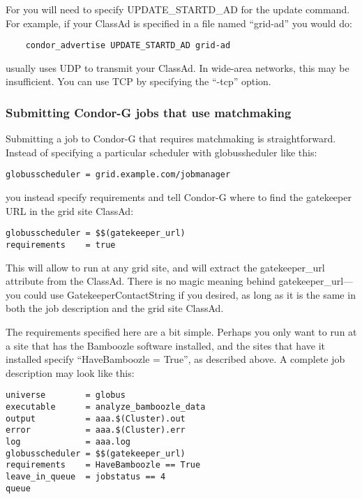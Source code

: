 For  you will need to specify UPDATE\_STARTD\_AD for
the update command. For example, if your ClassAd is specified in a
file named ``grid-ad'' you would do:

\footnotesize
\begin{verbatim}
    condor_advertise UPDATE_STARTD_AD grid-ad
\end{verbatim}
\normalsize

 usually uses UDP to transmit your ClassAd. In
wide-area networks, this may be insufficient. You can use TCP by
specifying the ``-tcp'' option. 

\subsubsection{Submitting Condor-G jobs that use matchmaking}

Submitting a job to Condor-G that requires matchmaking is
straightforward. Instead of specifying a particular scheduler with
globussheduler like this:

\footnotesize
\begin{verbatim}
globusscheduler = grid.example.com/jobmanager
\end{verbatim}
\normalsize

you instead specify requirements and tell Condor-G where to find the
gatekeeper URL in the grid site ClassAd:

\footnotesize
\begin{verbatim}
globusscheduler = $$(gatekeeper_url)
requirements    = true
\end{verbatim}
\normalsize

This will allow to run at any grid site, and will extract the
gatekeeper\_url attribute from the ClassAd. There is no magic meaning
behind gatekeeper\_url---you could use GatekeeperContactString if you
desired, as long as it is the same in both the job description and the
grid site ClassAd. 

The requirements specified here are a bit simple. Perhaps you only
want to run at a site that has the Bamboozle software installed, and
the sites that have it installed specify ``HaveBamboozle = True'', as
described above. A complete job description may look like this:

\footnotesize
\begin{verbatim}
universe        = globus
executable      = analyze_bamboozle_data
output          = aaa.$(Cluster).out
error           = aaa.$(Cluster).err
log             = aaa.log
globusscheduler = $$(gatekeeper_url)
requirements    = HaveBamboozle == True
leave_in_queue  = jobstatus == 4
queue
\end{verbatim}
\normalsize

